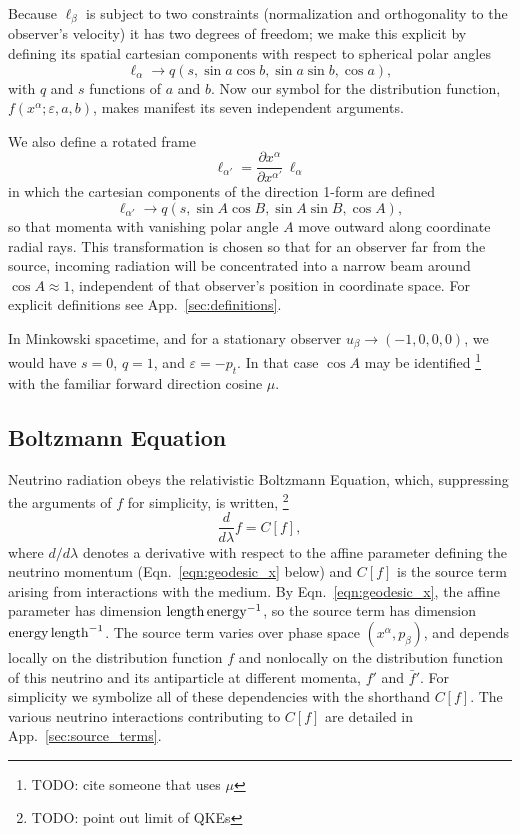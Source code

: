 \documentclass[aps,floatfix,prd,superscriptaddress,twocolumn]{revtex4-1}
\begin{document}
Because $\ell_\beta$ is subject to two constraints
(normalization and orthogonality to the observer's velocity)
it has two degrees of freedom; we make this explicit by defining its
spatial cartesian components with respect to spherical polar angles
\begin{equation}
  \label{eqn:def_direction}
  \ell_\alpha \rightarrow
  q (s,\sin a \cos b,\sin a\sin b,\cos a),
\end{equation}
with $q$ and $s$ functions of $a$ and $b$.
Now our symbol for the distribution function,
$f(x^\alpha;\varepsilon,a,b)$,
makes manifest its seven independent arguments.

We also define a rotated frame
\begin{equation}
  \ell_{\alpha'}=\frac{\partial x^\alpha}{\partial x^{\alpha'}}\,\ell_\alpha \nonumber
\end{equation}
in which the cartesian components of the direction 1-form are defined
\begin{equation}
  \label{eqn:def_direction_primed}
  \ell_{\alpha'} \rightarrow
  q (s,\sin A \cos B,\sin A\sin B,\cos A),
\end{equation}
so that momenta with vanishing polar angle $A$ move outward along coordinate
radial rays.
This transformation is chosen so that for an observer far from the source,
incoming radiation will be concentrated into a narrow beam around $\cos A\approx1$,
independent of that observer's position in coordinate space.
For explicit definitions see App.~\ref{sec:definitions}.

In Minkowski spacetime, and for a stationary observer
$u_\beta\rightarrow(-1,0,0,0)$, we would have $s=0$, $q=1$,
and $\varepsilon=-p_t$. In that case $\cos A$ may be identified
\footnote{TODO: cite someone that uses $\mu$}
with the familiar forward direction cosine $\mu$.

\subsection{Boltzmann Equation}
\label{ssec:boltzmann}
Neutrino radiation obeys the relativistic Boltzmann Equation,
which, suppressing the arguments of $f$ for simplicity, is written,
\footnote{TODO: point out limit of QKEs}
\begin{equation}
  \label{eqn:boltzmann}
  \frac{d}{d\lambda}f = C[f],
\end{equation}
where $d/d\lambda$ denotes a derivative with respect to the affine
parameter defining the neutrino momentum (Eqn.~\ref{eqn:geodesic_x} below)
and $C[f]$ is the source term arising from interactions with the medium.
By Eqn.~\ref{eqn:geodesic_x},
the affine parameter has dimension ${\rm length}\,{\rm energy}^{-1}$,
so the source term has dimension ${\rm energy}\,{\rm length}^{-1}$.
The source term varies over phase space $(x^\alpha,p_\beta)$,
and depends locally on the distribution function $f$
and nonlocally on the distribution function of this neutrino and its
antiparticle at different momenta, $f'$ and $\bar{f}'$.
For simplicity we symbolize all of these dependencies with the shorthand $C[f]$.
The various neutrino interactions contributing to $C[f]$ are detailed in
App.~\ref{sec:source_terms}.
\end{document}
